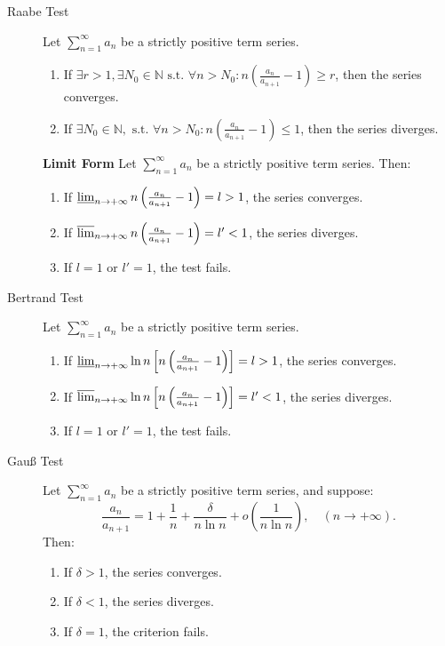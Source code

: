 \documentclass[11pt]{../../TexTemplate/elegantbook}
\begin{document}
\begin{theorem}
\begin{description}
    \item[Raabe Test] Let \( \sum_{n=1}^{\infty} a_n \) be a strictly positive term series.
        \begin{enumerate}
            \item If \( \exists r > 1, \exists N_0 \in \mathbb{N} \text{ s.t. } 
                \forall n > N_0: n \left( \frac{a_n}{a_{n+1}} - 1 \right) \geqslant r \), 
                then the series converges.
            \item If \( \exists N_0 \in \mathbb{N}, \text{ s.t. } \forall n > N_0: 
                n \left( \frac{a_n}{a_{n+1}} - 1 \right) \leqslant 1 \), then the series diverges.
        \end{enumerate}
        \textbf{Limit Form}
        Let \( \sum_{n=1}^{\infty} a_n \) be a strictly positive term series. Then:
        \begin{enumerate}
            \item If \( \varliminf_{n \to +\infty} n \left( \frac{a_n}{a_{n+1}} - 1 \right) = l > 1 \), the series converges.
            \item If \( \varlimsup_{n \to +\infty} n \left( \frac{a_n}{a_{n+1}} - 1 \right) = l' < 1 \), the series diverges.
            \item If \( l = 1 \) or \( l' = 1 \), the test fails.
        \end{enumerate}

    \item[Bertrand Test] Let \( \sum_{n=1}^{\infty} a_n \) be a strictly positive term series.
        \begin{enumerate}
            \item If \( \varliminf_{n \to +\infty} \ln n \left[ n \left( \frac{a_n}{a_{n+1}} - 1 \right) \right] = l > 1 \), 
                the series converges.
            \item If \( \varlimsup_{n \to +\infty} \ln n \left[ n \left( \frac{a_n}{a_{n+1}} - 1 \right) \right] = l' < 1 \), 
                the series diverges.
            \item If \( l = 1 \) or \( l' = 1 \), the test fails.
        \end{enumerate}

    \item [Gauß Test] Let \( \sum_{n=1}^{\infty} a_n \) be a strictly positive term series, and suppose:
        \[
        \frac{a_n}{a_{n+1}} = 1 + \frac{1}{n} + \frac{\delta}{n \ln n} + o\left( \frac{1}{n \ln n} \right), \quad (n \to +\infty).
        \]
        Then:
        \begin{enumerate}
            \item If \( \delta > 1 \), the series converges.
            \item If \( \delta < 1 \), the series diverges.
            \item If \( \delta = 1 \), the criterion fails.
        \end{enumerate}


\end{description}
\end{theorem}
\end{document}

